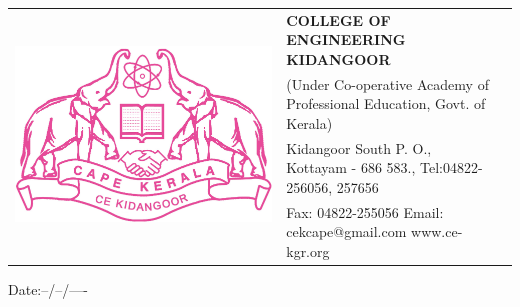 \newpage
\thispagestyle{empty}

\begin{table}[h]

\begin{center}
\begin{tabular}{lll}
    
    \multirow{4}{*}{\includegraphics[scale=0.15]{frontpages/ceklogo.jpg}}& \hspace{0.1cm} \Large
    
    {\textbf{\color{blue}COLLEGE OF ENGINEERING KIDANGOOR}}\\
    &\hspace{0.5cm}\normalsize{\color{blue}(Under Co-operative Academy of Professional Education, Govt. of Kerala)}\\&\hspace{0.8cm} \normalsize {\color{blue}Kidangoor South P. O., Kottayam - 686 583., Tel:04822-256056, 257656}\\&\hspace{0.1cm} \normalsize{\color{blue}Fax: 04822-255056 \hspace{1.3cm} Email: cekcape@gmail.com \hspace{1.3cm} www.ce-kgr.org}
    
\end{tabular}
\end{center}
\label{tab:multicol}
\end{table}


\begin{flushright}
Date:--/--/----
\end{flushright}


